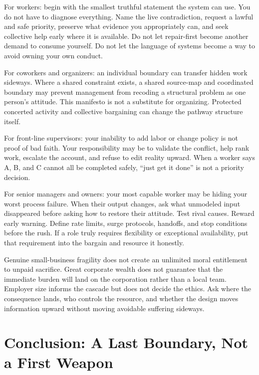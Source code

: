 \documentclass[11pt,oneside]{article}
\begin{document}
For workers: begin with the smallest truthful statement the system can
use. You do not have to diagnose everything. Name the live
contradiction, request a lawful and safe priority, preserve what
evidence you appropriately can, and seek collective help early where it
is available. Do not let repair-first become another demand to consume
yourself. Do not let the language of systems become a way to avoid
owning your own conduct.

For coworkers and organizers: an individual boundary can transfer hidden
work sideways. Where a shared constraint exists, a shared source-map and
coordinated boundary may prevent management from recoding a structural
problem as one person's attitude. This manifesto is not a substitute for
organizing. Protected concerted activity and collective bargaining can
change the pathway structure itself.

For front-line supervisors: your inability to add labor or change policy
is not proof of bad faith. Your responsibility may be to validate the
conflict, help rank work, escalate the account, and refuse to edit
reality upward. When a worker says A, B, and C cannot all be completed
safely, ``just get it done'' is not a priority decision.

For senior managers and owners: your most capable worker may be hiding
your worst process failure. When their output changes, ask what
unmodeled input disappeared before asking how to restore their attitude.
Test rival causes. Reward early warning. Define rate limits, surge
protocols, handoffs, and stop conditions before the rush. If a role
truly requires flexibility or exceptional availability, put that
requirement into the bargain and resource it honestly.

Genuine small-business fragility does not create an unlimited moral
entitlement to unpaid sacrifice. Great corporate wealth does not
guarantee that the immediate burden will land on the corporation rather
than a local team. Employer size informs the cascade but does not decide
the ethics. Ask where the consequence lands, who controls the resource,
and whether the design moves information upward without moving avoidable
suffering sideways.

\hypertarget{conclusion-a-last-boundary-not-a-first-weapon}{%
\section{Conclusion: A Last Boundary, Not a First
Weapon}\label{conclusion-a-last-boundary-not-a-first-weapon}}
\end{document}
